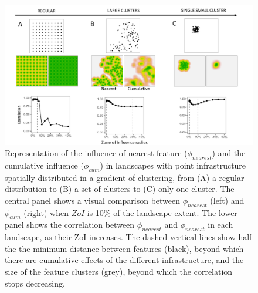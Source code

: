 \documentclass[titlepage]{article}
\begin{document}
\begin{figure}[h]
\centering
\includegraphics[width=1.3\textwidth,center]{figures/simulated_landscapes.png}
\caption{\label{fig:simulated_landscapes} Representation of the influence of nearest feature ($\phi_{nearest}$) and the cumulative influence ($\phi_{cum}$) in landscapes with point infrastructure spatially distributed in a gradient of clustering, from (A) a regular distribution 
to (B) a set of clusters 
to (C) only one cluster. 
The central panel shows  a visual comparison between $\phi_{nearest}$ (left) and $\phi_{cum}$ (right) when $ZoI$ is 10\% of the landscape extent. The lower panel shows the correlation between $\phi_{nearest}$ and $\phi_{nearest}$ in each landscape, as their ZoI increases. The dashed vertical lines show half the the minimum distance between features (black), beyond which there are cumulative effects of the different infrastructure, and the size of the feature clusters (grey), beyond which the correlation stops decreasing.}
\end{figure}
\end{document}
